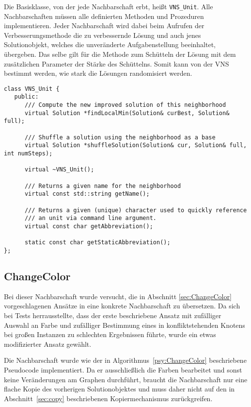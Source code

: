 Die Basisklasse, von der jede Nachbarschaft erbt, heißt \texttt{VNS\_Unit}. Alle Nachbarschaften müssen alle definierten Methoden und Prozeduren implementieren. Jeder Nachbarschaft wird dabei beim Aufrufen der
Verbesserungsmethode die zu verbessernde Lösung und auch jenes Solutionobjekt, welches die unveränderte Aufgabenstellung beeinhaltet, übergeben. Das selbe gilt für die Methode zum Schütteln der Lösung mit dem
zusätzlichen Parameter der Stärke des Schüttelns. Somit kann von der VNS bestimmt werden, wie stark die Lösungen randomisiert werden. 

\singlespacing
\begin{lstlisting}[caption={Signatur der Basisklasse \texttt{VNS\_Unit}, von welcher alle Nachbarschaften erben},label={lst:vnsunit}]
class VNS_Unit {
   public:
      /// Compute the new improved solution of this neighborhood
      virtual Solution *findLocalMin(Solution& curBest, Solution& full);

      /// Shuffle a solution using the neighborhood as a base
      virtual Solution *shuffleSolution(Solution& cur, Solution& full, int numSteps);
   
      virtual ~VNS_Unit();
      
      /// Returns a given name for the neighborhood
      virtual const std::string getName();

      /// Returns a given (unique) character used to quickly reference
      /// an unit via command line argument.
      virtual const char getAbbreviation();
      
      static const char getStaticAbbreviation();
};
\end{lstlisting}

\subsection{ChangeColor}
Bei dieser Nachbarschaft wurde versucht, die in Abschnitt \ref{sec:ChangeColor} vorgeschlagenen Ansätze in eine konkrete Nachbarschaft zu übersetzen. Da sich bei Tests herrausstellte, dass der erste beschriebene Ansatz
mit zufälliger Auswahl an Farbe und zufälliger Bestimmung eines in konfliktstehenden Knotens bei großen Instanzen zu schlechten Ergebnissen führte, wurde ein etwas modifizierter Ansatz gewählt.

Die Nachbarschaft wurde wie der in Algorithmus~\ref{psy:ChangeColor} beschriebene Pseudocode implementiert. Da er ausschließlich die Farben bearbeitet und sonst keine Veränderungen am Graphen durchführt,
braucht die Nachbarschaft nur eine flache Kopie des vorherigen Solutionobjektes und muss daher nicht auf den in Abschnitt~\ref{sec:copy} beschriebenen Kopiermechanismus zurückgreifen. 

